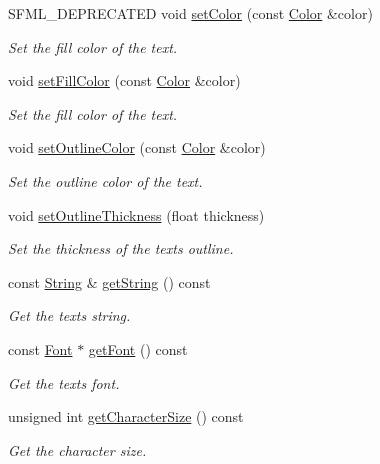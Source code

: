 \begin{DoxyCompactItemize}
S\+F\+M\+L\+\_\+\+D\+E\+P\+R\+E\+C\+A\+T\+ED void \hyperlink{classsf_1_1_text_a6ce65272d6d63ed01118366e92c68132}{set\+Color} (const \hyperlink{classsf_1_1_color}{Color} \&color)
\begin{DoxyCompactList}\small\item\em Set the fill color of the text. \end{DoxyCompactList}\item 
void \hyperlink{classsf_1_1_text_ab7bb3babac5a6da1802b2c3e1a3e6dcc}{set\+Fill\+Color} (const \hyperlink{classsf_1_1_color}{Color} \&color)
\begin{DoxyCompactList}\small\item\em Set the fill color of the text. \end{DoxyCompactList}\item 
void \hyperlink{classsf_1_1_text_aa19ec69c3b894e963602a6804ca68fe4}{set\+Outline\+Color} (const \hyperlink{classsf_1_1_color}{Color} \&color)
\begin{DoxyCompactList}\small\item\em Set the outline color of the text. \end{DoxyCompactList}\item 
void \hyperlink{classsf_1_1_text_ab0e6be3b40124557bf53737fe6a6ce77}{set\+Outline\+Thickness} (float thickness)
\begin{DoxyCompactList}\small\item\em Set the thickness of the text\textquotesingle{}s outline. \end{DoxyCompactList}\item 
const \hyperlink{classsf_1_1_string}{String} \& \hyperlink{classsf_1_1_text_a084c275eb4bca835696af5f8f9c80ab3}{get\+String} () const
\begin{DoxyCompactList}\small\item\em Get the text\textquotesingle{}s string. \end{DoxyCompactList}\item 
const \hyperlink{classsf_1_1_font}{Font} $\ast$ \hyperlink{classsf_1_1_text_a47cd96d7b2c37b2f820e4d6e1bb83f96}{get\+Font} () const
\begin{DoxyCompactList}\small\item\em Get the text\textquotesingle{}s font. \end{DoxyCompactList}\item 
unsigned int \hyperlink{classsf_1_1_text_a46d1d7f1d513bb8d434e985a93ea5224}{get\+Character\+Size} () const
\begin{DoxyCompactList}\small\item\em Get the character size. \end{DoxyCompactList}\item 

\end{DoxyCompactItemize}
